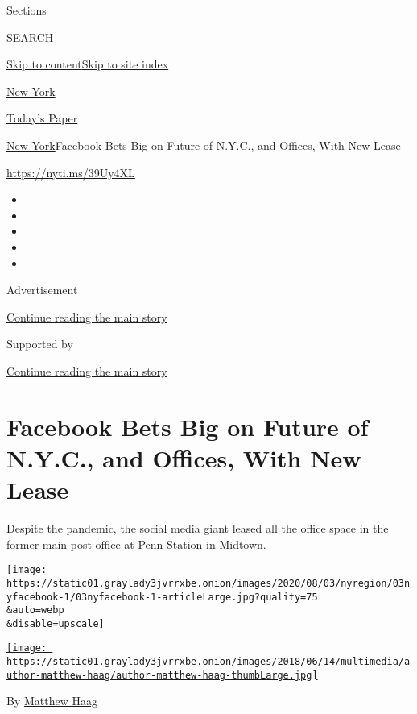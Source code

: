 Sections

SEARCH

\protect\hyperlink{site-content}{Skip to
content}\protect\hyperlink{site-index}{Skip to site index}

\href{https://www.nytimes3xbfgragh.onion/section/nyregion}{New York}

\href{https://myaccount.nytimes3xbfgragh.onion/auth/login?response_type=cookie\&client_id=vi}{}

\href{https://www.nytimes3xbfgragh.onion/section/todayspaper}{Today's
Paper}

\href{/section/nyregion}{New York}\textbar{}Facebook Bets Big on Future
of N.Y.C., and Offices, With New Lease

\url{https://nyti.ms/39Uy4XL}

\begin{itemize}
\item
\item
\item
\item
\item
\end{itemize}

Advertisement

\protect\hyperlink{after-top}{Continue reading the main story}

Supported by

\protect\hyperlink{after-sponsor}{Continue reading the main story}

\hypertarget{facebook-bets-big-on-future-of-nyc-and-offices-with-new-lease}{%
\section{Facebook Bets Big on Future of N.Y.C., and Offices, With New
Lease}\label{facebook-bets-big-on-future-of-nyc-and-offices-with-new-lease}}

Despite the pandemic, the social media giant leased all the office space
in the former main post office at Penn Station in Midtown.

\texttt{[image: https://static01.graylady3jvrrxbe.onion/images/2020/08/03/nyregion/03nyfacebook-1/03nyfacebook-1-articleLarge.jpg?quality=75\\\&auto=webp\\\&disable=upscale]}

\href{https://www.nytimes3xbfgragh.onion/by/matthew-haag}{\texttt{[image: https://static01.graylady3jvrrxbe.onion/images/2018/06/14/multimedia/author-matthew-haag/author-matthew-haag-thumbLarge.jpg]}}

By \href{https://www.nytimes3xbfgragh.onion/by/matthew-haag}{Matthew
Haag}

